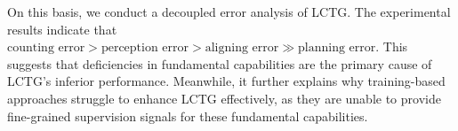 On this basis, we conduct a decoupled error analysis of LCTG. The experimental results indicate that $\text{counting error} > \text{perception error} > \text{aligning error} \gg \text{planning error}$. This suggests that deficiencies in fundamental capabilities are the primary cause of LCTG’s inferior performance. Meanwhile, it further explains why training-based approaches struggle to enhance LCTG effectively, as they are unable to provide fine-grained supervision signals for these fundamental capabilities.




